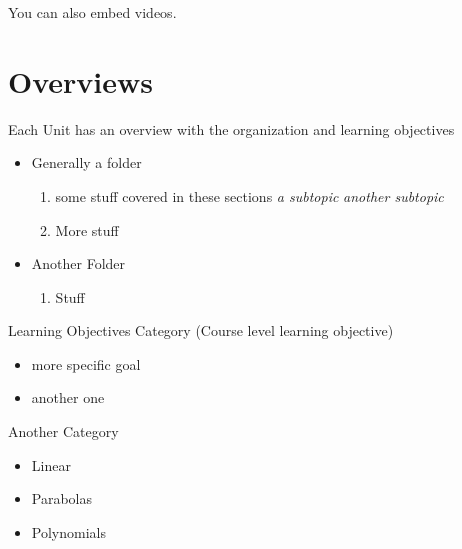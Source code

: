\documentclass[nooutcomes]{ximera}
\begin{document}
You can also embed  videos.
\begin{center}
\end{center}





\newpage


\section{Overviews}

Each Unit has an overview with the organization and learning objectives

\begin{overview}\begin{itemize}
\item Generally a folder %
	\begin{enumerate}
	\item some stuff covered in these sections
		\textit{a subtopic} 
		\textit{another subtopic} 
	\item More stuff	
	\end{enumerate}	
\item Another Folder 
	\begin{enumerate}	
	\item Stuff 
	\end{enumerate} 
\end{itemize}\end{overview}


\begin{objectives}
\item Learning Objectives Category (Course level learning objective)
	\begin{itemize}
	\item more specific goal
	\item another one 
	\end{itemize}
\item Another Category
	\begin{itemize}
	\item Linear 
	\item Parabolas 
	\item Polynomials 
	\end{itemize}
\end{objectives}
\end{document}
